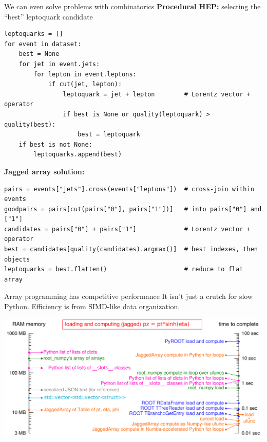 \documentclass[aspectratio=169]{beamer}
\begin{document}
\begin{frame}[fragile]{We can even solve problems with combinatorics}
\vspace{0.35 cm}
{\normalsize\bf Procedural HEP:} selecting the ``best'' leptoquark candidate

\scriptsize
\begin{verbatim}
leptoquarks = []
for event in dataset:
    best = None
    for jet in event.jets:
        for lepton in event.leptons:
            if cut(jet, lepton):
                leptoquark = jet + lepton        # Lorentz vector + operator
                if best is None or quality(leptoquark) > quality(best):
                    best = leptoquark
    if best is not None:
        leptoquarks.append(best)
\end{verbatim}

\vspace{0.5 cm}
{\normalsize\bf Jagged array solution:}

\scriptsize
\begin{verbatim}
pairs = events["jets"].cross(events["leptons"])  # cross-join within events
goodpairs = pairs[cut(pairs["0"], pairs["1"])]   # into pairs["0"] and ["1"]
candidates = pairs["0"] + pairs["1"]             # Lorentz vector + operator
best = candidates[quality(candidates).argmax()]  # best indexes, then objects
leptoquarks = best.flatten()                     # reduce to flat array
\end{verbatim}
\end{frame}

\begin{frame}{Array programming has competitive performance}
\vspace{0.25 cm}
It isn't just a crutch for slow Python. Efficiency is from SIMD-like data organization.

\vspace{0.4 cm}
\includegraphics[width=\linewidth]{logscales.pdf}
\end{frame}
\end{document}
